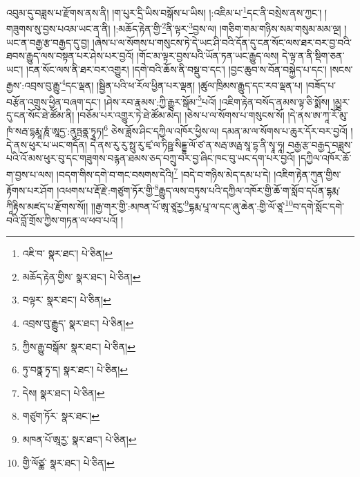 འབུམ་དུ་བཟླས་པ་རྫོགས་ནས་ནི། །ག་པུར་དྲི་ཡིས་བསྒོས་པ་ཡིས། །:འཇིམ་པ་\footnote{འཇི་བ་  སྣར་ཐང་།  པེ་ཅིན། }དང་ནི་བསྲེས་ནས་ཀྱང་། །གཟུགས་སུ་བྱས་པའམ་ཡང་ན་ནི། །:མཆོད་རྟེན་གྱི་\footnote{མཆོད་རྟེན་གྱིས་  སྣར་ཐང་།  པེ་ཅིན། }ནི་ལྟར་\footnote{བལྟར་  སྣར་ཐང་།  པེ་ཅིན། }བྱས་ལ། །གཅིག་གམ་གཉིས་སམ་གསུམ་མམ་ལྔ། །ཡང་ན་བརྒྱ་རྩ་བརྒྱད་དུ་བྱ། །ཞེས་པ་ལ་སོགས་པ་གསུངས་ཏེ་དེ་ཡང་ཤི་བའི་དོན་དུ་ངན་སོང་ལས་ཐར་བར་བྱ་བའི་ཐབས་རྒྱུད་ལས་བསྟན་པར་ཤེས་པར་བྱའོ། །གོང་མ་ལྟར་བྱས་པའི་ཡོན་ཏན་ཡང་རྒྱུད་ལས། དེ་ལྟ་ན་ནི་སྡིག་ཅན་ཡང་། །ངན་སོང་ལས་ནི་ཐར་བར་འགྱུར། །དགེ་བའི་ཆོས་ནི་བསྡུ་བ་དང་། །བྱང་ཆུབ་ས་བོན་བསྐྱེད་པ་དང་། །སངས་རྒྱས་:འབྲས་བུ་རྒྱུ་\footnote{འབྲས་བུ་རྒྱུད་  སྣར་ཐང་།  པེ་ཅིན། }དང་ལྡན། །སྦྱིན་པའི་ཕ་རོལ་ཕྱིན་པར་ལྡན། །ཚུལ་ཁྲིམས་རྒྱུད་དང་རབ་ལྡན་པ། །བཟོད་པ་བརྩོན་འགྲུས་ཕྱིན་བཞག་དང་། །ཤེས་རབ་རྣམས་:ཀྱི་རྒྱུར་སྒོམ་\footnote{ཀྱིས་རྒྱུ་བསྒོམ་  སྣར་ཐང་།  པེ་ཅིན། }པའོ། །འཇིག་རྟེན་བསོད་ནམས་ལྟ་ཅི་སྨོས། །མྱུར་དུ་ངན་སོང་ཐེ་ཚོམ་ནི། །བཅོམ་པར་འགྱུར་ཏེ་ཐེ་ཚོམ་མེད། །ཅེས་པ་ལ་སོགས་པ་གསུངས་སོ། །དེ་ནས་ཨ་ཀཱ་རོ་མུ་ཁཾ་སརྦ་དྷརྨཱ་ཎཱཾ་ཨཱདྱ་:ནུཏྤནྣ་ཏྭཱཏ།\footnote{ཏུ་བནྣ་ཏྭ་ད།  སྣར་ཐང་།  པེ་ཅིན། } ཅེས་ཟློས་ཤིང་དཀྱིལ་འཁོར་ཕྱིས་ལ། དམན་མ་ལ་སོགས་པ་ཆུར་དོར་བར་བྱའོ། །དེ་ནས་ཕུར་པ་ཡང་གདོན། དེ་ནས་རུ་རུ་སྥུ་རུ་ཛྭ་ལ་ཏིཥྛ་སིདྡྷ་ལོ་ཙ་ན་སརྦ་ཨརྠ་སཱ་དྷ་ནི་སྭཱ་ཧཱ། བརྒྱ་རྩ་བརྒྱད་བཟླས་པའི་འོ་མས་ཕུར་བུ་དང་གཟུགས་བརྙན་ཐམས་ཅད་བཀྲུ་བར་བྱ་ཞིང་ཁང་བུ་ཡང་དག་པར་བྱའོ། །དཀྱིལ་འཁོར་ཆོ་ག་བྱས་པ་ལས། །བདག་གིས་དགེ་བ་གང་བསགས་དེའི།\footnote{དེས།  སྣར་ཐང་།  པེ་ཅིན། } །བདེ་བ་གཉིས་མེད་དམ་པ་དེ། །འཇིག་རྟེན་ཀུན་གྱིས་རྟོགས་པར་ཤོག །འཕགས་པ་རྡོ་རྗེ་:གཙུག་ཏོར་གྱི་\footnote{གཙུག་ཏོར་  སྣར་ཐང་། }རྒྱུད་ལས་བཏུས་པའི་དཀྱིལ་འཁོར་གྱི་ཆོ་ག་སློབ་དཔོན་དྷརྨ་ཀཱིརྟིས་མཛད་པ་རྫོགས་སོ།། །།རྒྱ་གར་གྱི་:མཁན་པོ་ཨཱ་ཙཱརྱ་\footnote{མཁན་པོ་ཨཱརྱ་  སྣར་ཐང་།  པེ་ཅིན། }དྷརྨ་པཱ་ལ་དང་ཞུ་ཆེན་:གྱི་ལོ་ཙཱ་\footnote{གྱི་ལོཙྪ་  སྣར་ཐང་།  པེ་ཅིན། }བ་དགེ་སློང་དགེ་བའི་བློ་གྲོས་ཀྱིས་གཏན་ལ་ཕབ་པའོ། ། 
